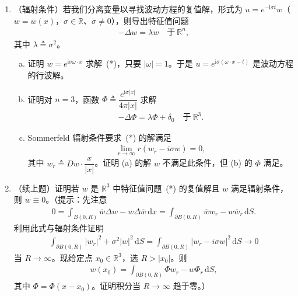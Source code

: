 \documentclass[../../main.tex]{subfiles}
\begin{document}
\begin{enumerate}
\item （辐射条件）若我们分离变量以寻找波动方程的复值解，形式为 $u=e^{-\mathrm{i}\sigma t}w$（$w=w(x)$，$\sigma\in\mathbb{R}$、$\sigma\neq 0$），则导出特征值问题
\begin{align}
-\Delta w=\lambda w\quad\text{于}\ \mathbb{R}^{n},
\end{align}
其中 $\lambda\triangleq\sigma^{2}$。
\begin{enumerate}[(a)]
\item 证明 $w=e^{\mathrm{i}\sigma\omega\cdot x}$ 求解~(*)，只要 $|\omega|=1$。于是 $u=e^{\mathrm{i}\sigma(\omega\cdot x-t)}$ 是波动方程的行波解。
\item 证明对 $n=3$，函数 $\Phi\triangleq\dfrac{e^{\mathrm{i}\sigma|x|}}{4\pi|x|}$ 求解
\begin{align*}
-\Delta\Phi=\lambda\Phi+\delta_{0}\quad\text{于}\ \mathbb{R}^{3}.
\end{align*}
\item Sommerfeld 辐射条件要求~(*) 的解满足
\begin{align*}
\lim_{r\to\infty}r(w_{r}-i\sigma w)=0,
\end{align*}
其中 $w_{r}\triangleq Dw\cdot\dfrac{x}{|x|}$。证明 (a) 的解 $w$ 不满足此条件，但 (b) 的 $\Phi$ 满足。
\end{enumerate}

\item （续上题）证明若 $w$ 是 $\mathbb{R}^{3}$ 中特征值问题~(*) 的复值解且 $w$ 满足辐射条件，则 $w\equiv 0$。（提示：先注意
\begin{align*}
0=\int_{B(0,R)}\overline{w}\Delta w-w\Delta\overline{w}\,\mathrm{d}x=\int_{\partial B(0,R)}\overline{w}w_{r}-w\overline{w}_{r}\,\mathrm{d}S.
\end{align*}
利用此式与辐射条件证明
\begin{align*}
\int_{\partial B(0,R)}|w_{r}|^{2}+\sigma^{2}|w|^{2}\,\mathrm{d}S=\int_{\partial B(0,R)}|w_{r}-i\sigma w|^{2}\,\mathrm{d}S\to 0
\end{align*}
当 $R\to\infty$。现给定点 $x_{0}\in\mathbb{R}^{3}$，选 $R>|x_{0}|$。则
\begin{align*}
w(x_{0})=\int_{\partial B(0,R)}\Phi w_{r}-w\Phi_{r}\,\mathrm{d}S,
\end{align*}
其中 $\Phi=\Phi(x-x_{0})$。证明积分当 $R\to\infty$ 趋于零。）
\end{enumerate}
\end{document}
